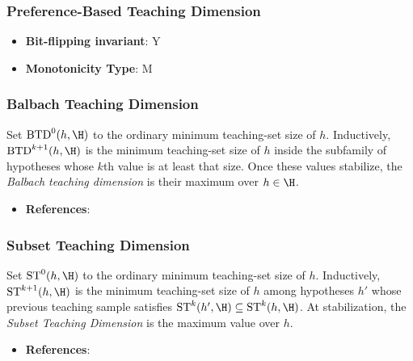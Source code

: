 \subsubsection{Preference-Based Teaching Dimension}
      
      \begin{definition}\label{def:preference-based_teaching_dimension}
      
      \end{definition}
      \begin{itemize}
      \item {\bf Bit-flipping invariant}: Y
      \item {\bf Monotonicity Type}: M
      \end{itemize}
\subsubsection{Balbach Teaching Dimension}
      \begin{definition}\label{def:balbach_teaching_dimension}
      Set $\mathrm{BTD}^{0}(h,\H)$ to the ordinary minimum teaching-set size of $h$. Inductively, $\mathrm{BTD}^{k+1}(h,\H)$ is the minimum teaching-set size of $h$ inside the subfamily of hypotheses whose $k$th value is at least that size. Once these values stabilize, the \emph{Balbach teaching dimension} is their maximum over $h\in\H$.
      \end{definition}
      \begin{itemize}
      \item {\bf References}: \cite{balbach2008measuring}
      \end{itemize}
\subsubsection{Subset Teaching Dimension}
      \begin{definition}\label{def:subset_teaching_dimension}
      Set $\mathrm{ST}^{0}(h,\H)$ to the ordinary minimum teaching-set size of $h$. Inductively, $\mathrm{ST}^{k+1}(h,\H)$ is the minimum teaching-set size of $h$ among hypotheses $h'$ whose previous teaching sample satisfies $\mathrm{ST}^{k}(h',\H)\subseteq\mathrm{ST}^{k}(h,\H)$. At stabilization, the \emph{Subset Teaching Dimension} is the maximum value over $h$.
      \end{definition}
      \begin{itemize}
      \item {\bf References}: \cite{zilles2011models}
      \end{itemize}
